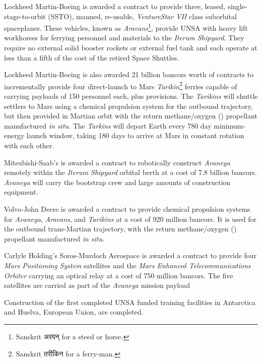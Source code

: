 Lockheed Martin-Boeing is awarded a contract to provide three, leased, single-stage-to-orbit (SSTO), manned, re-usable, {\it VentureStar VII} class suborbital spaceplanes. These vehicles, known as {\it Aravans}\footnote{Sanskrit अरवन् for a steed or horse.}, provide UNSA with heavy lift workhorses for ferrying personnel and materials to the {\it Iterum Shipyard}. They require no external solid booster rockets or external fuel tank and each operate at less than a fifth of the cost of the retired Space Shuttles.

Lockheed Martin-Boeing is also awarded 21 billion bancors worth of contracts to incrementally provide four direct-launch to Mars {\it Tarikin}\footnote{Sanskrit तरीकिन for a ferry-man.} ferries capable of carrying payloads of 150 personnel each, plus provisions. The {\it Tarikins} will shuttle settlers to Mars using a chemical  propulsion system for the outbound trajectory, but then provided in Martian orbit with the return methane/oxygen () propellant manufactured {\it in situ}. The {\it Tarkins} will depart Earth every 780 day minimum-energy launch window, taking 180 days to arrive at Mars in constant rotation with each other.

Mitsubishi-Saab's is awarded a contract to robotically construct {\it Avaneya} remotely within the {\it Iterum Shipyard} orbital berth at a cost of 7.8 billion bancors. {\it Avaneya} will carry the bootstrap crew and large amounts of construction equipment.

Volvo-John Deere is awarded a contract to provide chemical propulsion systems for {\it Avaneya}, {\it Aravans}, and {\it Tarikins} at a cost of 920 million bancors. It is used for the outbound trans-Martian trajectory, with the return methane/oxygen () propellant manufactured {\it in situ}.

Carlyle Holding's Soros-Murdoch Aerospace is awarded a contract to provide four {\it Mars Positioning System} satellites and the {\it Mars Enhanced Telecommunications Orbiter} carrying an optical relay at a cost of 750 million bancors. The five satellites are carried as part of the {\it Avaneya} mission payload
\StopTimelineDate

Construction of the first completed UNSA funded training facilities in Antarctica and Huelva, European Union, are completed.
\StopTimelineDate

